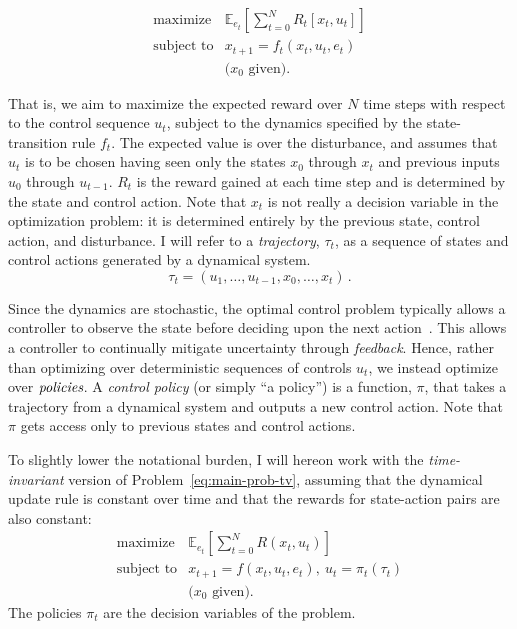 \documentclass[11pt]{article}
\newcommand{\eqd}[1]{\eqref{eq:#1}}
\numberwithin{equation}{section}
\newcommand{\E}{\mathbb{E}}
\begin{document}
\begin{equation}\label{eq:main-prob-tv}
\begin{array}{ll}
\mbox{maximize} & \E_{e_t}[ \sum_{t=0}^N R_t[x_t,u_t] ]\\
\mbox{subject to} &	x_{t+1} = f_t(x_t, u_t, e_t)\\
& \mbox{($x_0$ given).}
\end{array}
\end{equation}

That is, we aim to maximize the expected reward over $N$ time steps with respect to the control sequence $u_t$, subject to the dynamics specified by the state-transition rule $f_t$.  The expected value is over the disturbance, and assumes that $u_t$ is to be chosen having seen only the states $x_0$ through $x_t$ and previous inputs $u_0$ through $u_{t-1}$. $R_t$ is the reward gained at each time step and is determined by the state and control action. Note that $x_t$ is not really a decision variable in the optimization problem: it is determined entirely by the previous state, control action, and disturbance. I will refer to a \emph{trajectory}, $\tau_t$, as a sequence of states and control actions generated by a dynamical system.
\begin{equation}\label{eq:trajectory}
\tau_t = (u_1,\ldots,u_{t-1},x_0,\ldots,x_t) \,.
\end{equation}

Since the dynamics are stochastic, the optimal control problem typically allows a controller to observe the state before deciding upon the next action~\cite{BertsekasDPBook}. This allows a controller to continually mitigate uncertainty through \emph{feedback}. Hence, rather than optimizing over deterministic sequences of controls $u_t$, we instead optimize over $\emph{policies}$.  A \emph{control policy} (or simply ``a policy'') is a function, $\pi$, that takes a trajectory from a dynamical system and outputs a new control action.  Note that $\pi$  gets access only to previous states and control actions. 

To slightly lower the notational burden, I will hereon work with the \emph{time-invariant} version of Problem~\eqd{main-prob-tv}, assuming that the dynamical update rule is constant over time and that the rewards for state-action pairs are also constant:
\begin{equation}\label{eq:main-prob}
\begin{array}{ll}
\mbox{maximize} & \E_{e_t}[ \sum_{t=0}^N R(x_t,u_t) ]\\
\mbox{subject to} &	x_{t+1} = f(x_t, u_t, e_t),~u_t = \pi_t(\tau_t)\\
& \mbox{($x_0$ given).}
\end{array}
\end{equation}
The policies $\pi_t$ are the decision variables of the problem.
\end{document}
